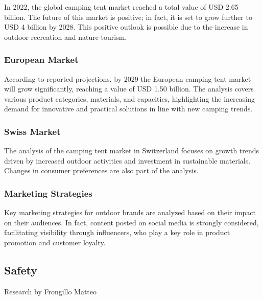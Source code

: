 \documentclass{article}
\begin{document}
In 2022, the global camping tent market reached a total value of USD 2.65 billion. The
future of this market is positive; in fact, it is set to grow further to USD 4 billion by
2028. This positive outlook is possible due to the increase in outdoor recreation and
nature tourism.\\


\subsubsection{European Market}

According to reported projections, by 2029 the European camping tent market will grow
significantly, reaching a value of USD 1.50 billion. The analysis covers various product
categories, materials, and capacities, highlighting the increasing demand for innovative
and practical solutions in line with new camping trends.\\


\subsubsection{Swiss Market}

The analysis of the camping tent market in Switzerland focuses on growth trends driven by
increased outdoor activities and investment in sustainable materials. Changes in consumer
preferences are also part of the analysis.\\


\subsubsection{Marketing Strategies}

Key marketing strategies for outdoor brands are analyzed based on their impact on their
audiences. In fact, content posted on social media is strongly considered, facilitating
visibility through influencers, who play a key role in product promotion and customer
loyalty.\\


\subsection{Safety}
{\small Research by Frongillo Matteo}
\end{document}
